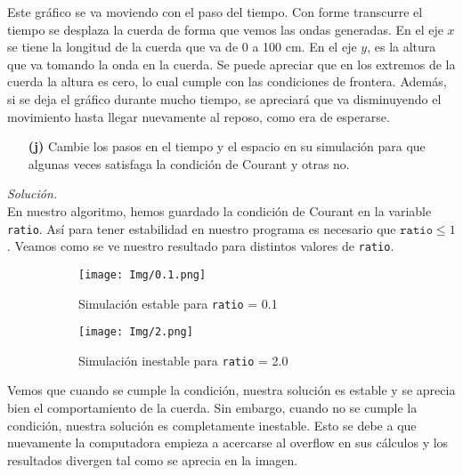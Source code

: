 \documentclass[11pt]{article}
\begin{document}
	Este gráfico se va moviendo con el paso del tiempo. Con forme transcurre el tiempo se desplaza la cuerda de forma que vemos las ondas generadas. En el eje $x$ se tiene la longitud de la cuerda que va de 0 a 100 cm. En el eje $y$, es la altura que va tomando la onda en la cuerda. Se puede apreciar que en los extremos de la cuerda la altura es cero, lo cual cumple con las condiciones de frontera. Además, si se deja el gráfico durante mucho tiempo, se apreciará que va disminuyendo el movimiento hasta llegar nuevamente al reposo, como era de esperarse.
	
	
	\begin{enumerate}
		\item [\textbf{(j)}] Cambie los pasos en el tiempo y el espacio en su simulación para que algunas veces satisfaga la condición de Courant y otras no.  
	\end{enumerate}
	\textit{Solución.}\\
	En nuestro algoritmo, hemos guardado la condición de Courant en la variable \texttt{ratio}. Así para tener estabilidad en nuestro programa es necesario que $\texttt{ratio}\leq 1$. Veamos como se ve nuestro resultado para distintos valores de \texttt{ratio}.
	\begin{figure}[htp!]
		\begin{subfigure}[b]{0.48\textwidth}
			\centering
			\texttt{[image: Img/0.1.png]}
			\caption{Simulación estable para \texttt{ratio} = 0.1}
			\label{}
		\end{subfigure}
		\hfill
		\begin{subfigure}[b]{0.48\textwidth}
			\centering
			\texttt{[image: Img/2.png]}
			\caption{Simulación inestable para \texttt{ratio} = 2.0}
			\label{}
		\end{subfigure}
		\caption{}
		\label{}
	\end{figure}

	Vemos que cuando se cumple la condición, nuestra solución es estable y se aprecia bien el comportamiento de la cuerda. Sin embargo, cuando no se cumple la condición, nuestra solución es completamente inestable. Esto se debe a que nuevamente la computadora empieza a acercarse al overflow en sus cálculos y los resultados divergen tal como se aprecia en la imagen.
\end{document}

